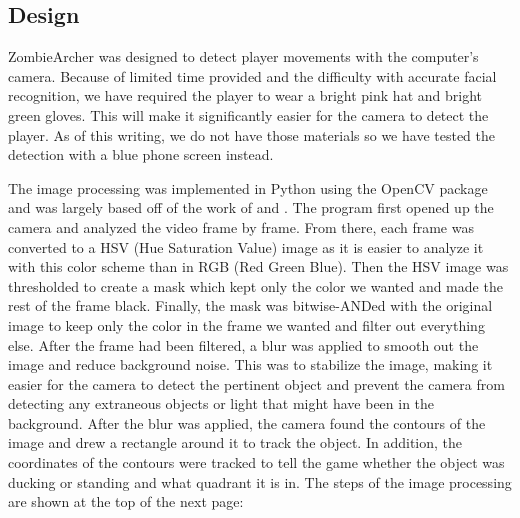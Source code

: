 \documentclass[titlepage, 12pt]{scrartcl}
\begin{document}
    \subsection{Design}
    ZombieArcher was designed to detect player movements with the computer's camera. Because of limited time provided and the difficulty with accurate facial recognition, we have required the player to wear a bright pink hat and bright green gloves. This will make it significantly easier for the camera to detect the player. As of this writing, we do not have those materials so we have tested the detection with a blue phone screen instead.\par
    The image processing was implemented in Python using the OpenCV package and was largely based off of the work of \cite{Mordvintsev_2013} and \cite{Sharma}. The program first opened up the camera and analyzed the video frame by frame. From there, each frame was converted to a HSV (Hue Saturation Value) image as it is easier to analyze it with this color scheme than in RGB (Red Green Blue). Then the HSV image was thresholded to create a mask which kept only the color we wanted and made the rest of the frame black. Finally, the mask was bitwise-ANDed with the original image to keep only the color in the frame we wanted and filter out everything else. After the frame had been filtered, a blur was applied to smooth out the image and reduce background noise. This was to stabilize the image, making it easier for the camera to detect the pertinent object and prevent the camera from detecting any extraneous objects or light that might have been in the background. After the blur was applied, the camera found the contours of the image and drew a rectangle around it to track the object. In addition, the coordinates of the contours were tracked to tell the game whether the object was ducking or standing and what quadrant it is in.
    The steps of the image processing are shown at the top of the next page:
\end{document}
